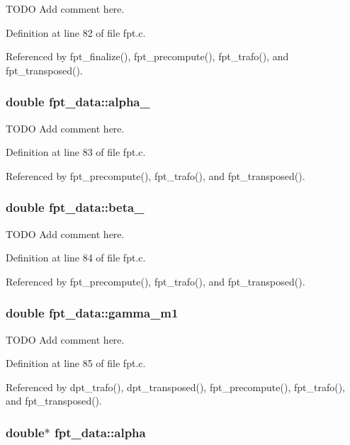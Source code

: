 TODO Add comment here. 



Definition at line 82 of file fpt.c.

Referenced by fpt\_\-finalize(), fpt\_\-precompute(), fpt\_\-trafo(), and fpt\_\-transposed().\hypertarget{structfpt__data_13e1adc5987793ecf5a4b633e9100df7}{
\subsubsection{\setlength{\rightskip}{0pt plus 5cm}double {\bf fpt\_\-data::alpha\_}}}
\label{structfpt__data_13e1adc5987793ecf5a4b633e9100df7}


TODO Add comment here. 



Definition at line 83 of file fpt.c.

Referenced by fpt\_\-precompute(), fpt\_\-trafo(), and fpt\_\-transposed().\hypertarget{structfpt__data_bd27c835f0b1cdfd1888ff0402d766b3}{
\subsubsection{\setlength{\rightskip}{0pt plus 5cm}double {\bf fpt\_\-data::beta\_}}}
\label{structfpt__data_bd27c835f0b1cdfd1888ff0402d766b3}


TODO Add comment here. 



Definition at line 84 of file fpt.c.

Referenced by fpt\_\-precompute(), fpt\_\-trafo(), and fpt\_\-transposed().\hypertarget{structfpt__data_041e7eddf4d86b6425c2c94548d2c905}{
\subsubsection{\setlength{\rightskip}{0pt plus 5cm}double {\bf fpt\_\-data::gamma\_\-m1}}}
\label{structfpt__data_041e7eddf4d86b6425c2c94548d2c905}


TODO Add comment here. 



Definition at line 85 of file fpt.c.

Referenced by dpt\_\-trafo(), dpt\_\-transposed(), fpt\_\-precompute(), fpt\_\-trafo(), and fpt\_\-transposed().\hypertarget{structfpt__data_e132db4edcdbf60c1f61760e3f595259}{
\subsubsection{\setlength{\rightskip}{0pt plus 5cm}double$\ast$ {\bf fpt\_\-data::alpha}}}
\label{structfpt__data_e132db4edcdbf60c1f61760e3f595259}


